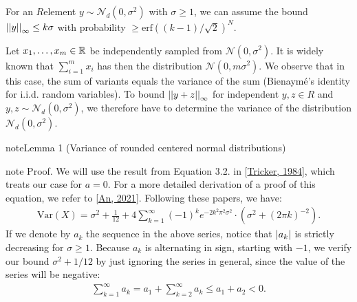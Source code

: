 \documentclass[letterpaper,10pt,english]{jupyterBook}
\begin{document}
\sphinxAtStartPar
For an \(R\)\sphinxhyphen{}element \(y \sim \mathcal N_d(0,\sigma^2)\) with \(\sigma \ge 1\), we can assume the bound \(\left\lvert\left\lvert y \right\rvert\right\rvert_\infty \le k\sigma\) with probability \(\ge \mathrm{erf}\left( (k-1)/\sqrt{2} \right)^N\).

\begin{DUlineblock}{0em}
\item[] 
\end{DUlineblock}

\sphinxAtStartPar
Let \(x_1,\dots,x_m \in \mathbb R\) be independently sampled from \(\mathcal N(0,\sigma^2)\).
It is widely known that \(\sum_{i=1}^m x_i\) has then the distribution \(\mathcal N(0,m\sigma^2)\).
We observe that in this case, the sum of variants equals the variance of the sum (Bienaymé’s identity for i.i.d. random variables).
To bound \(\left\lvert\left\lvert y+z \right\rvert\right\rvert_\infty\) for independent \(y,z \in R\) and \(y,z \sim \mathcal N_d(0,\sigma^2)\), we therefore have to determine the variance of the distribution \(\mathcal N_d(0,\sigma^2)\).
\label{Thesis:discrete-variance}
\begin{sphinxadmonition}{note}{Lemma 1 (Variance of rounded centered normal distributions)}
\end{sphinxadmonition}

\begin{sphinxadmonition}{note}
\sphinxAtStartPar
Proof. We will use the result from Equation 3.2. in {[}\hyperlink{cite.Thesis:id62}{Tricker, 1984}{]}, which treats our case for \(a=0\).
For a more detailed derivation of a proof of this equation, we refer to {[}\hyperlink{cite.Thesis:id63}{An, 2021}{]}.
Following these papers, we have:
\begin{equation*}
\begin{split}\mathrm{Var}(X) = \sigma^2 + \frac{1}{12} + 4 \sum_{k=1}^\infty (-1)^k e^{-2k^2\pi^2\sigma^2} \cdot (\sigma^2 + (2\pi k)^{-2}).\end{split}
\end{equation*}
\sphinxAtStartPar
If we denote by \(a_k\) the sequence in the above series, notice that \(\left\lvert a_k \right\rvert\) is strictly decreasing for \(\sigma \ge 1\).
Because \(a_k\) is alternating in sign, starting with \(-1\), we verify our bound \(\sigma^2 + 1/12\) by just ignoring the series in general, since the value of the series will be negative:
\begin{equation*}
\begin{split}\sum_{k=1}^\infty a_k = a_1 + \sum_{k=2}^\infty a_k \le a_1 + a_2 < 0.\end{split}
\end{equation*}\end{sphinxadmonition}
\end{document}
